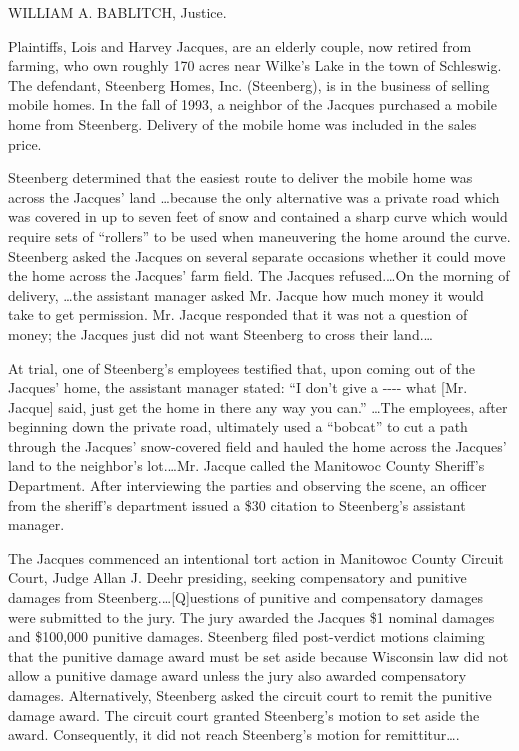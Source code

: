 
WILLIAM A. BABLITCH, Justice.

Plaintiffs, Lois and Harvey Jacques, are an elderly couple, now retired from
farming, who own roughly 170 acres near Wilke's Lake in the town of Schleswig.
The defendant, Steenberg Homes, Inc. (Steenberg), is in the business of selling
mobile homes. In the fall of 1993, a neighbor of the Jacques purchased a mobile
home from Steenberg. Delivery of the mobile home was included in the sales
price.

Steenberg determined that the easiest route to deliver the mobile home was
across the Jacques' land \ldots because the only alternative was a private
road which was covered in up to seven feet of snow and contained a sharp curve
which would require sets of ``rollers'' to be used when maneuvering the home
around the curve. Steenberg asked the Jacques on several separate occasions
whether it could move the home across the Jacques' farm field. The Jacques
refused.\ldots On the morning of delivery, \ldots the assistant manager
asked Mr. Jacque how much money it would take to get permission. Mr. Jacque
responded that it was not a question of money; the Jacques just did not want
Steenberg to cross their land.\ldots

At trial, one of Steenberg's employees testified that, upon coming out of the
Jacques' home, the assistant manager stated: ``I don't give a -{}-{}-{}- what
[Mr. Jacque] said, just get the home in there any way you can.'' \ldots The
employees, after beginning down the private road, ultimately used a ``bobcat''
to cut a path through the Jacques' snow-covered field and hauled the home
across the Jacques' land to the neighbor's lot.\ldots Mr. Jacque called the
Manitowoc County Sheriff's Department. After interviewing the parties and
observing the scene, an officer from the sheriff's department issued a \$30
citation to Steenberg's assistant manager.

The Jacques commenced an intentional tort action in Manitowoc County Circuit
Court, Judge Allan J. Deehr presiding, seeking compensatory and punitive
damages from Steenberg.\ldots[Q]uestions of punitive and compensatory damages
were submitted to the jury. The jury awarded the Jacques \$1 nominal damages
and \$100,000 punitive damages. Steenberg filed post-verdict motions claiming
that the punitive damage award must be set aside because Wisconsin law did not
allow a punitive damage award unless the jury also awarded compensatory
damages. Alternatively, Steenberg asked the circuit court to remit the punitive
damage award. The circuit court granted Steenberg's motion to set aside the
award. Consequently, it did not reach Steenberg's motion for remittitur\ldots.

